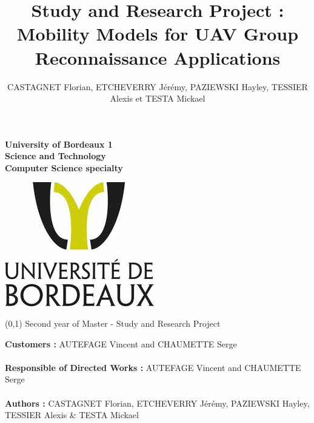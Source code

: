 \documentclass[12pt,a4paper]{report}
\author{CASTAGNET Florian, ETCHEVERRY Jérémy, PAZIEWSKI Hayley, TESSIER Alexis et TESTA Mickael}
\title{Study and Research Project : Mobility Models for UAV Group Reconnaissance Applications}
\begin{document}
\thispagestyle{empty}
\setcounter{page}{0}

\begin{minipage}{0.5\linewidth}
\begin{flushleft}
\textbf{University of Bordeaux 1 \\Science and Technology \\Computer Science specialty}\\ 
\end{flushleft}
\end{minipage}
\begin{minipage}{0.5\linewidth}
\begin{flushright}
\includegraphics[scale = 0.4]{../images/logo}
\end{flushright}
\end{minipage}

\vspace{4cm}

\begin{center}
\boxput*(0,1){
\colorbox{white}{Second year of Master - Study and Research Project}
}
{
\setlength{\fboxsep}{12pt} 
}

\end{center}

\vspace{4cm}

\noindent
\begin{center}
\textbf{Customers :} AUTEFAGE Vincent and CHAUMETTE Serge\\~\\
\textbf{Responsible of Directed Works :} AUTEFAGE Vincent and CHAUMETTE Serge\\~\\
\vspace{4cm}
\textbf{Authors :} CASTAGNET Florian, ETCHEVERRY Jérémy, PAZIEWSKI Hayley, TESSIER Alexis \& TESTA Mickael\\
\end{center}
\end{document}
